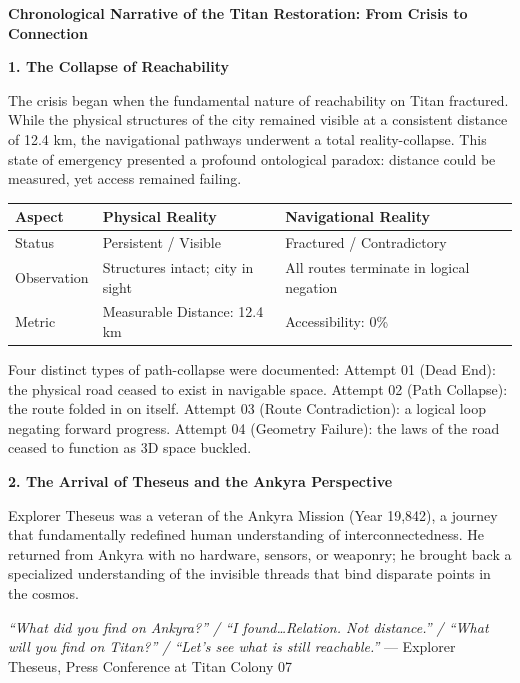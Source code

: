 \documentclass[11pt]{article}
\begin{document}
\begin{archivebox}
\textcolor{archiveGold}{\textbf{Chronological Narrative of the Titan Restoration: From Crisis to Connection}}\\[6pt]
\small

\textbf{1. The Collapse of Reachability}

The crisis began when the fundamental nature of reachability on Titan fractured. While the physical structures of the city remained visible at a consistent distance of 12.4 km, the navigational pathways underwent a total reality-collapse. This state of emergency presented a profound ontological paradox: distance could be measured, yet access remained failing.

\begin{center}
\begin{tabular}{lll}
\toprule
\textbf{Aspect} & \textbf{Physical Reality} & \textbf{Navigational Reality} \\
\midrule
Status & Persistent / Visible & Fractured / Contradictory \\
Observation & Structures intact; city in sight & All routes terminate in logical negation \\
Metric & Measurable Distance: 12.4 km & Accessibility: 0\% \\
\bottomrule
\end{tabular}
\end{center}

Four distinct types of path-collapse were documented: Attempt 01 (Dead End): the physical road ceased to exist in navigable space. Attempt 02 (Path Collapse): the route folded in on itself. Attempt 03 (Route Contradiction): a logical loop negating forward progress. Attempt 04 (Geometry Failure): the laws of the road ceased to function as 3D space buckled.

\textbf{2. The Arrival of Theseus and the Ankyra Perspective}

Explorer Theseus was a veteran of the Ankyra Mission (Year 19,842), a journey that fundamentally redefined human understanding of interconnectedness. He returned from Ankyra with no hardware, sensors, or weaponry; he brought back a specialized understanding of the invisible threads that bind disparate points in the cosmos.

\textit{``What did you find on Ankyra?'' / ``I found\ldots Relation. Not distance.'' / ``What will you find on Titan?'' / ``Let's see what is still reachable.''} --- Explorer Theseus, Press Conference at Titan Colony 07


\end{archivebox}
\end{document}
